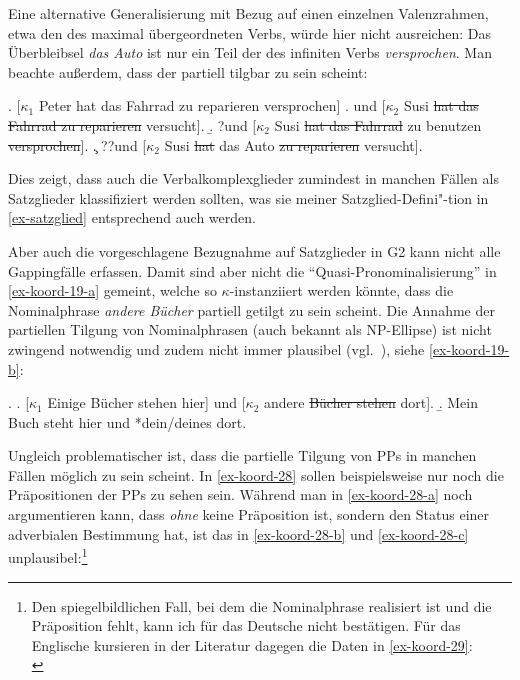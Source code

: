 Eine alternative Generalisierung mit Bezug auf einen einzelnen Valenzrahmen, etwa den des maximal übergeordneten Verbs, würde hier nicht ausreichen: Das Überbleibsel {\it das Auto} ist nur ein Teil der  des infiniten Verbs {\it versprochen}. Man beachte au\ss erdem, dass der  partiell tilgbar zu sein scheint:

\ex. [$\kappa_1$ Peter hat das Fahrrad zu reparieren versprochen]\label{ex-koord-verbalkomplex}
\a. und [$\kappa_2$ Susi \sout{hat das Fahrrad zu reparieren} versucht].
\b. ?und [$\kappa_2$ Susi \sout{hat das Fahrrad} zu benutzen \sout{versprochen}].
\c. ??und [$\kappa_2$  Susi \sout{hat} das Auto \sout{zu reparieren} versucht].

Dies zeigt, dass auch die Verbalkomplexglieder zumindest in manchen Fällen als Satzglieder klassifiziert werden sollten, was sie meiner Satzglied-Defini"-tion in \ref{ex-satzglied} entsprechend auch werden.  

Aber auch die vorgeschlagene Bezugnahme auf Satzglieder in G2 kann nicht alle Gappingfälle erfassen. Damit sind aber nicht die "`Quasi-Pronominalisierung"' \citep{Kunze:72} in \ref{ex-koord-19-a} gemeint, welche so $\kappa$-instanziiert werden könnte, dass die Nominalphrase {\it andere Bücher} partiell getilgt zu sein scheint. Die Annahme der partiellen Tilgung von Nominalphrasen (auch bekannt als NP-Ellipse) ist nicht zwingend notwendig und zudem nicht immer plausibel (vgl.\ \citealt[781f]{Klein:93}), siehe \ref{ex-koord-19-b}:

\ex. \label{ex-koord-19}
\a. \label{ex-koord-19-a}[$\kappa_1$ Einige Bücher stehen hier] und [$\kappa_2$ andere \sout{Bücher stehen} dort]. \hfill \citep[(3-160)]{Hesse:Kuestner:85}
\b. \label{ex-koord-19-b}Mein Buch steht hier und *dein/deines dort. \hfill \citep[(3-161)]{Hesse:Kuestner:85}

Ungleich problematischer ist, dass die partielle Tilgung von PPs in manchen Fällen möglich zu sein scheint. In \ref{ex-koord-28} sollen beispielsweise nur noch die Präpositionen der PPs zu sehen sein. Während man in \ref{ex-koord-28-a} noch argumentieren kann, dass {\it ohne} keine Präposition ist, sondern den Status einer adverbialen Bestimmung hat, ist das in \ref{ex-koord-28-b} und \ref{ex-koord-28-c} unplausibel:\footnote{Den spiegelbildlichen Fall, bei dem die Nominalphrase realisiert ist und die Präposition fehlt, kann ich für das Deutsche nicht bestätigen. Für das Englische kursieren in der Literatur dagegen die Daten in \ref{ex-koord-29}:\\
}

